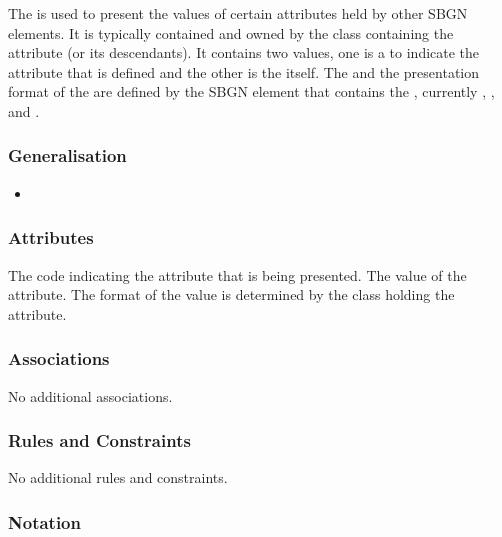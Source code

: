 The  is used to present the values of certain
attributes held by other SBGN elements. It is typically contained and
owned by the class containing the attribute (or its descendants). It
contains two values, one is a  to indicate the attribute
that is defined and the other is the itself. The
 and the presentation format of the  are
defined by the SBGN element that contains the
, currently ,
, and .


\subsubsection{Generalisation}

\begin{itemize}
\item {}
\end{itemize}

\subsubsection{Attributes}

\begin{attributes}
   The code indicating the attribute that is
  being presented.
   The value of the attribute. The format of
  the value is determined by the class holding the attribute.
\end{attributes}

\subsubsection{Associations}

No additional associations.

\subsubsection{Rules and Constraints}

No additional rules and constraints.

\subsubsection{Notation}

